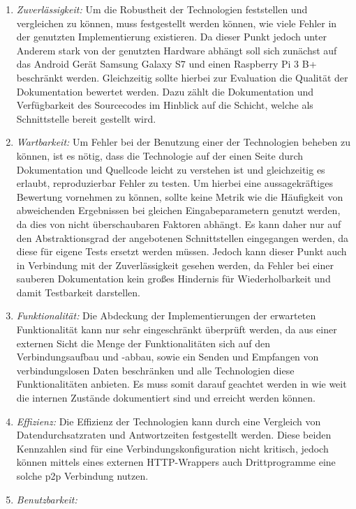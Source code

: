     	\begin{enumerate}
    	\item {\it Zuverlässigkeit:} 
    	Um die Robustheit der Technologien feststellen und vergleichen zu können, muss festgestellt werden können, wie viele Fehler in der genutzten Implementierung existieren. Da dieser Punkt jedoch unter Anderem stark von der genutzten Hardware abhängt soll sich zunächst auf das Android Gerät Samsung Galaxy S7 und einen Raspberry Pi 3 B+ beschränkt werden. Gleichzeitig sollte hierbei zur Evaluation die Qualität der Dokumentation bewertet werden. Dazu zählt die Dokumentation und Verfügbarkeit des Sourcecodes im Hinblick auf die Schicht, welche als Schnittstelle bereit gestellt wird.
    	\item {\it Wartbarkeit:} Um Fehler bei der Benutzung einer der Technologien beheben zu können, ist es nötig, dass die Technologie auf der einen Seite durch Dokumentation und Quellcode leicht zu verstehen ist und gleichzeitig es erlaubt, reproduzierbar Fehler zu testen. Um hierbei eine aussagekräftiges Bewertung vornehmen zu können, sollte keine Metrik wie die Häufigkeit von abweichenden Ergebnissen bei gleichen Eingabeparametern genutzt werden, da dies von nicht überschaubaren Faktoren abhängt. Es kann daher nur auf den Abstraktionsgrad der angebotenen Schnittstellen eingegangen werden, da diese für eigene Tests ersetzt werden müssen. Jedoch kann dieser Punkt auch in Verbindung mit der Zuverlässigkeit gesehen werden, da Fehler bei einer sauberen Dokumentation kein großes Hindernis für Wiederholbarkeit und damit Testbarkeit darstellen.
    	\item {\it Funktionalität:}
    	Die Abdeckung der Implementierungen der erwarteten Funktionalität kann nur sehr eingeschränkt überprüft werden, da aus einer externen Sicht die Menge der Funktionalitäten sich auf den Verbindungsaufbau und -abbau, sowie ein Senden und Empfangen von verbindungslosen Daten beschränken und alle Technologien diese Funktionalitäten anbieten. Es muss somit darauf geachtet werden in wie weit die internen Zustände dokumentiert sind und erreicht werden können.
    	\item {\it Effizienz:}
    	Die Effizienz der Technologien kann durch eine Vergleich von Datendurchsatzraten und Antwortzeiten festgestellt werden. Diese beiden Kennzahlen sind für eine Verbindungskonfiguration nicht kritisch, jedoch können mittels eines externen HTTP-Wrappers auch Drittprogramme eine solche p2p Verbindung nutzen.
    	\item {\it Benutzbarkeit:}

\end{enumerate}
